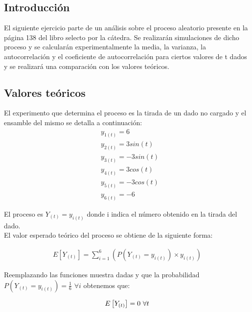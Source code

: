 

\subsection{Introducción}

El siguiente ejercicio parte de un análisis sobre el proceso aleatorio presente en la página 138 del libro selecto por la cátedra. Se realizarán simulaciones de dicho proceso y se calcularán experimentalmente la media, la varianza, la autocorrelación y el coeficiente de autocorrelación para ciertos valores de t dados y se realizará una comparación con los valores teóricos.

\subsection{Valores teóricos}

El experimento que determina el proceso es la tirada de un dado no cargado y el ensamble del mismo se detalla a continuación:
\begin{equation} 
	\begin{split}
		 &y_{1(t)} = 6 \\
		 &y_{2(t)} = 3sin(t) \\
		 &y_{3(t)} = -3sin(t) \\
		 &y_{4(t)} = 3cos(t) \\
		 &y_{5(t)} = -3cos(t) \\
		 &y_{6(t)} = -6
	\end{split}
\end{equation}

El proceso es $Y_{(t)} = y_{i(t)}$ donde i indica el número obtenido en la tirada del dado.\\

El valor esperado teórico del proceso se obtiene de la siguiente forma:

\begin{equation*}
\begin{gathered}
	E\left[Y_{(t)}\right] = \sum_{i=1}^{6}\left( P(Y_{(t)} = y_{i(t)}) \times y_{i(t)}\right) 
\end{gathered}
\end{equation*}

Reemplazando las funciones muestra dadas y que la probabilidad $P(Y_{(t)} = y_{i(t)})= \frac{1}{6}$ $ \forall i $ obtenemos que:	

\begin{equation*}
\begin{gathered}
	E\left[Y_{(t)}\right] = 0$ $\forall t 
\end{gathered}
\end{equation*}

